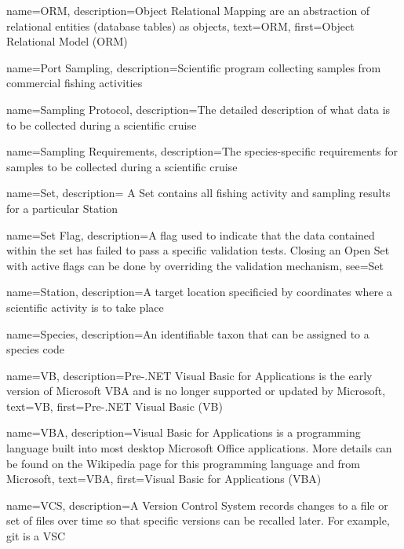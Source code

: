  {
    name=ORM,
    description={Object Relational Mapping are an abstraction of relational entities (database tables) as objects},
    text={ORM},
    first={Object Relational Model (ORM)}
}

 {
    name=Port Sampling,
    description={Scientific program collecting samples from commercial fishing activities}
}

 {
    name=Sampling Protocol,
    description={The detailed description of what data is to be collected during a scientific cruise}
}

 {
    name=Sampling Requirements,
    description={The species-specific requirements for samples to be collected during a scientific cruise}
}

 {
    name=Set,
    description={
        A Set contains all fishing activity and sampling results for a particular \gls{Station}
    }
}

 {
    name=Set Flag,
    description={A flag used to indicate that the data contained within the set has failed to pass a specific validation tests.
    Closing an \gls{Open Set} with active flags can be done by overriding the validation mechanism},
    see=\gls{Set}
}

 {
    name=Station,
    description={A target location specificied by coordinates where a scientific activity is to take place}
}

 {
    name=Species,
    description={An identifiable taxon that can be assigned to a species code}
}

 {
    name=VB,
    description={Pre-.NET Visual Basic for Applications is the early version of Microsoft VBA and is no longer supported or updated by Microsoft},
    text={VB},
    first={Pre-.NET Visual Basic (VB)}
}

 {
    name=VBA,
    description={Visual Basic for Applications is a programming language built into most desktop Microsoft Office applications. More details can be found on the Wikipedia page for this programming language and from Microsoft},
    text={VBA},
    first={Visual Basic for Applications (VBA)}
}

 {name={VCS},
    description={A Version Control System records changes to a file or set of files over time so that specific versions can be recalled later. For example, git is a VSC }}


